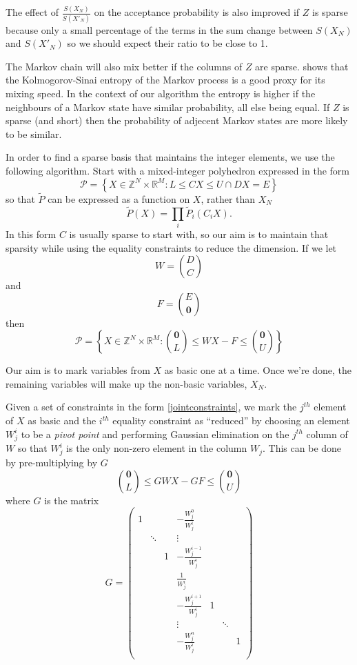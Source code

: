 \documentclass{article}
\begin{document}
The effect of $\frac{S(X_N)}{S(X'_N)}$ on the acceptance probability is also improved if $Z$ is sparse because only a small percentage of the terms in the sum change between $S(X_N)$ and $S(X'_N)$ so we should expect their ratio to be close to 1.

The Markov chain will also mix better if the columns of $Z$ are sparse. \citet{mihelich2018maximum} shows that the Kolmogorov-Sinai entropy of the Markov process is a good proxy for its mixing speed. In the context of our algorithm the entropy is higher if the neighbours of a Markov state have similar probability, all else being equal. If $Z$ is sparse (and short) then the probability of adjecent Markov states are more likely to be similar.

In order to find a sparse basis that maintains the integer elements, we use the following algorithm. Start with a mixed-integer polyhedron expressed in the form
\[
\mathcal{P} = \left\{X \in \mathbb{Z}^N \times \mathbb{R}^M: L \le CX \le U \cap DX = E \right\}
\]
so that $\tilde{P}$ can be expressed as a function on $X$, rather than $X_N$
\[
\tilde{P}(X) = \prod_i \tilde{P}_i(C_iX).
\]
In this form $C$ is usually sparse to start with, so our aim is to maintain that sparsity while using the equality constraints to reduce the dimension. If we let
\[
W= {D \choose C}
\]
and
\[
F = {E \choose \mathbf{0}}
\]
then
\begin{equation}
\mathcal{P} = \left\{X \in \mathbb{Z}^N \times \mathbb{R}^M: {\mathbf{0} \choose L} \le W X - F \le {\mathbf{0} \choose U} \right\}
\label{jointconstraints}
\end{equation}

Our aim is to mark variables from $X$ as basic one at a time. Once we're done, the remaining variables will make up the non-basic variables, $X_N$.

Given a set of constraints in the form \eqref{jointconstraints}, we mark the $j^{th}$ element of $X$ as basic and the $i^{th}$ equality constraint as ``reduced'' by choosing an element $W^i_j$ to be a \textit{pivot point} and performing Gaussian elimination on the $j^{th}$ column of $W$ so that $W^i_j$ is the only non-zero element in the column $W_j$. This can be done by pre-multiplying by $G$
\[
{\mathbf{0} \choose L} \le GWX - GF \le {\mathbf{0} \choose U}
\]
where $G$ is the matrix
\[
G =  
\begin{pmatrix}
1 &  & &-\frac{W^0_j}{W^i_j} & & &\\
& \ddots & &\vdots & & &\\
& & 1 & -\frac{W^{i-1}_j}{W^i_j} & & &\\
& & & \frac{1}{W^i_j} & & &\\
& &  & -\frac{W^{i+1}_j}{W^i_j} & 1 & &\\
& & & \vdots & & \ddots &\\
& & & -\frac{W^n_j}{W^i_j} & & &1\\
\end{pmatrix}
\]
\end{document}
